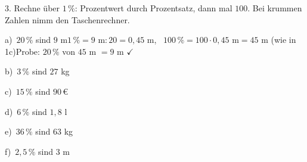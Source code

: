 \documentclass[11pt]{article}
\newcommand{\grau}[1]{{\color{mbgrau}#1}}
\begin{document}
\begin{pfaufg}{}{3.}{}
Rechne über $1\,\%$: Prozentwert durch Prozentsatz, dann mal $100$. Bei krummen Zahlen nimm den Taschenrechner.\par\medskip
\grau{a)\ $20\,\%$ sind $9$ m\quad $1\,\% = 9\text{ m} : 20 = 0{,}45$ m, \ $100\,\% = 100 \cdot 0{,}45\text{ m} = 45$ m (wie in 1c)\quad Probe: $20\,\%$ von $45$ m $= 9$ m $\checkmark$}\par\medskip
\noindent\begin{minipage}[t]{0.48\linewidth}
b)\ $3\,\%$ sind $27$ kg
\end{minipage}\hfill
\begin{minipage}[t]{0.48\linewidth}
c)\ $15\,\%$ sind $90\,€$
\end{minipage}
\noindent\begin{minipage}[t]{0.48\linewidth}
d)\ $6\,\%$ sind $1{,}8$ l
\end{minipage}\hfill
\begin{minipage}[t]{0.48\linewidth}
e)\ $36\,\%$ sind $63$ kg
\end{minipage}
\noindent\begin{minipage}[t]{0.48\linewidth}
f)\ $2{,}5\,\%$ sind $3$ m
\end{minipage}
\end{pfaufg}
\end{document}

